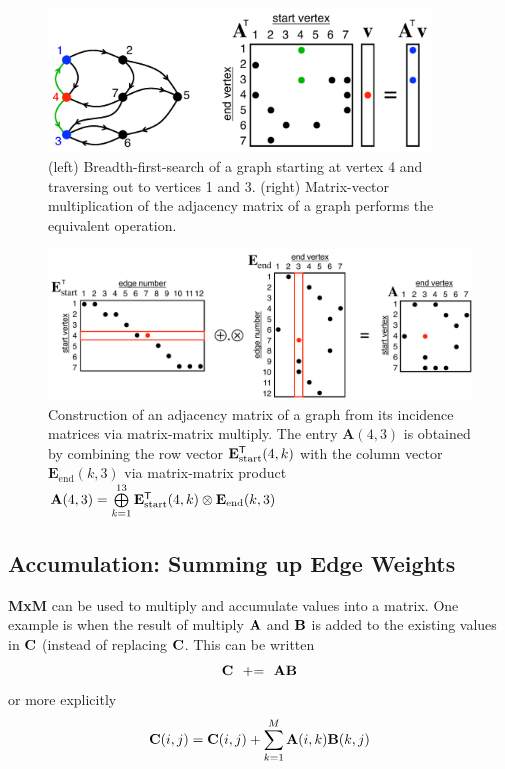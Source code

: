 \begin{figure}[!htb]
  \centering
    \includegraphics[width=4in]{figures/AdjacencyMatrixBFS.pdf}
      \caption{(left) Breadth-first-search of a graph starting at vertex 4 and traversing out to vertices 1 and 3.  (right) Matrix-vector multiplication of the adjacency matrix of a graph performs the equivalent operation.}
      \label{fig:AdjacencyMatrixBFS}
\end{figure}
\begin{figure}[!htb]
  \centering
    \includegraphics[width=5in]{figures/AdjacencyMatrixToIncidence.pdf}
      \caption{Construction of an adjacency matrix of a graph from its incidence matrices via matrix-matrix multiply.  The entry $\mathbf{A}(4,3)$ is obtained by combining the row vector $\mathbf{E}_\mathrm{start}^{\sf T}(4,k)$ with the column vector $\mathbf{E}_\mathrm{end}(k,3)$ via matrix-matrix product $\mathbf{A}(4,3)= \bigoplus\limits_{k = 1}^{13} \mathbf{E}_\mathrm{start}^{\sf T}(4,k) \otimes \mathbf{E}_\mathrm{end}(k,3)$}
      \label{fig:AdjacencyToIncidence}
\end{figure}


\subsection{Accumulation: Summing up Edge Weights}

{\bf MxM} can be used to multiply and accumulate values into a matrix.  One example is when the result of multiply ${\bf A}$ and ${\bf B}$ is added to the existing values in ${\bf C}$ (instead of replacing ${\bf C}$.  This can be written
$$
   {\bf C} ~~ {+}{=} ~~ {\bf A} {\bf B}
$$
or more explicitly
$$
   {\bf C}(i,j) = {\bf C}(i,j) + \sum_{k=1}^M {\bf A}(i,k) {\bf B}(k,j)
$$

